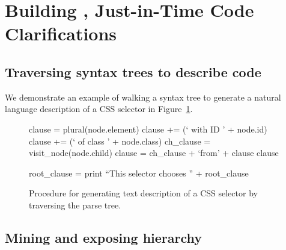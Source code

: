 \section{Building \systemname{}, Just-in-Time Code Clarifications}

\subsection{Traversing syntax trees to describe code}

We demonstrate an example of walking a syntax tree to generate a natural language description of a CSS selector in Figure~\ref{alg:css_traversal}.

\begin{figure}
\begin{algorithmic}

    \State clause = plural(node.element)
        \State clause += (` with ID ' + node.id)
        \State clause += (` of class ' + node.class)
    \EndIf
        \State ch\_clause = visit\_node(node.child)
        \State clause = ch\_clause + `from' + clause
    \EndIf
    \State \Return clause
\EndFunction

\State
{}
    \State root\_clause = 
    \State print ``This selector chooses '' + root\_clause
\EndFunction

\end{algorithmic}
\label{alg:css_traversal}
\caption{Procedure for generating text description of a CSS selector by traversing the parse tree.
}
\end{figure}

\subsection{Mining and exposing hierarchy}

\begin{figure}
\end{figure}

